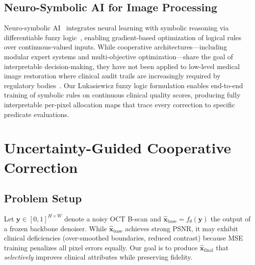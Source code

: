 \documentclass[journal,twoside,web]{ieeecolor}
\begin{document}
\subsection{Neuro-Symbolic AI for Image Processing}
Neuro-symbolic AI~\cite{garcez2023neurosymbolic} integrates neural learning with symbolic reasoning via differentiable fuzzy logic~\cite{vankrieken2022analyzing}, enabling gradient-based optimization of logical rules over continuous-valued inputs. While cooperative architectures---including modular expert systems and multi-objective optimization---share the goal of interpretable decision-making, they have not been applied to low-level medical image restoration where clinical audit trails are increasingly required by regulatory bodies~\cite{fdaaiml2021}. Our Lukasiewicz fuzzy logic formulation enables end-to-end training of symbolic rules on continuous clinical quality scores, producing fully interpretable per-pixel allocation maps that trace every correction to specific predicate evaluations.


\section{Uncertainty-Guided Cooperative Correction}
\label{sec:cooperative}

\subsection{Problem Setup}
\label{sec:problem_setup}
Let $\mathbf{y} \in [0,1]^{H \times W}$ denote a noisy OCT B-scan and $\hat{\mathbf{x}}_\text{base} = f_\theta(\mathbf{y})$ the output of a frozen backbone denoiser. While $\hat{\mathbf{x}}_\text{base}$ achieves strong PSNR, it may exhibit clinical deficiencies (over-smoothed boundaries, reduced contrast) because MSE training penalizes all pixel errors equally. Our goal is to produce $\hat{\mathbf{x}}_\text{final}$ that \emph{selectively} improves clinical attributes while preserving fidelity.
\end{document}
